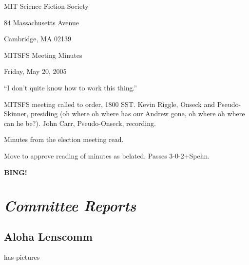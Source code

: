 \documentclass[10pt]{article}
\newcommand{\bing}{{\bf BING!} }
\newcommand{\goto}[1]{\bing \vskip 12pt \section*{{\em{#1}}}}
\begin{document}
\begin{center}

MIT Science Fiction Society

84 Massachusetts Avenue

Cambridge, MA 02139

\vspace{12pt}

MITSFS Meeting Minutes

Friday, May 20, 2005

\end{center}

\vspace{18pt}

\setlength{\parskip}{6pt}

\noinden
``I don't quite know how to work this thing.''

MITSFS meeting called to order, 1800 SST.
Kevin Riggle, Onseck and Pseudo-Skinner, presiding (oh where oh where has our Andrew gone, oh where oh where can he be?).
John Carr, Pseudo-Onseck, recording.

Minutes from the election meeting read.

Move to approve reading of minutes as belated.
Passes 3-0-2+Spehn.

\goto{Committee Reports}

\subsection*{Aloha Lenscomm}
has pictures





\end{document}
